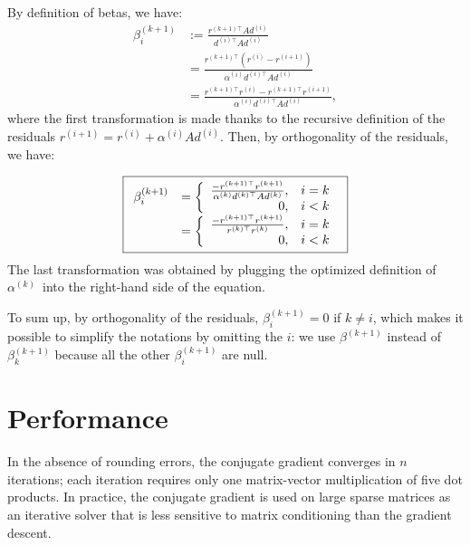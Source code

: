 \documentclass[notitlepage,oneside]{book}
\begin{document}
\begin{itemize}
By definition of betas, we have:
\begin{align*}
  \beta^{(k+1)}_i&:= \frac{r^{(k+1)\top}Ad^{(i)}  }{d^{(i)\top}Ad^{(i)}} \\
&= \frac{r^{(k+1)\top}(r^{(i)}- r^{(i+1)})  }{\alpha^{(i)} d^{(i)\top}Ad^{(i)}} \\
  &= \frac{r^{(k+1)\top}r^{(i)}- r^{(k+1)\top}r^{(i+1)}}{\alpha^{(i)} d^{(i)\top}Ad^{(i)}},
\end{align*}
where the first transformation is made thanks to the recursive definition of the residuals $r^{(i+1)}= r^{(i)}+\alpha^{(i)} A d^{(i)}$.
Then, by orthogonality of the residuals, we have:

\begin{equation}
\nonumber
\boxed{
\begin{array}{rcl}
\beta^{(k+1)}_i &= \left \{ \begin{array}{r l} \frac{- r^{(k+1)\top}r^{(k+1)}}{\alpha^{(k)} d^{(k)\top}Ad^{(k)}}, & i=k\\ 0, & i<k \end{array} \right. \\
                &= \left \{ \begin{array}{r l} \frac{- r^{(k+1)\top}r^{(k+1)}}{r^{(k)\top}r^{(k)}}, & i=k\\ 0, & i<k \end{array} \right. 
\end{array}
}
\end{equation}
The last transformation was obtained by plugging the optimized definition of $\alpha^{(k)}$ into the right-hand side of the equation.

To sum up, by orthogonality of the residuals, $\beta^{(k+1)}_i=0$ if $k\neq i$, which makes it possible to simplify the notations by omitting the $i$:
we use $\beta^{(k+1)}$ instead of $\beta_k^{(k+1)}$ because all the other $\beta_i^{(k+1)}$ are null.

\end{itemize}


\newpage
\section{Performance}

In the absence of rounding errors, the conjugate gradient converges in $n$ iterations; each iteration requires only one matrix-vector multiplication of five dot products.
In practice, the conjugate gradient is used on large sparse matrices as an iterative solver that is less sensitive to matrix conditioning than the gradient descent.
\end{document}
